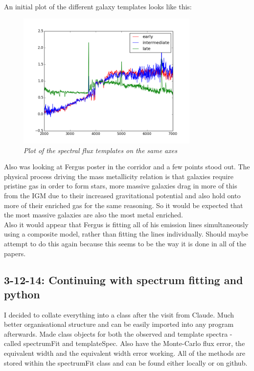 \documentclass{literature}
\begin{document}
An initial plot of the different galaxy templates looks like this: 

\begin{figure}[!htp]
\centering
\includegraphics[width=0.8\textwidth]{spectral_templates.png}
\caption{\footnotesize{\emph{Plot of the spectral flux templates on the same axes}}}
\label{templates}
\end{figure}

Also was looking at Fergus poster in the corridor and a few points stood out. The physical process driving the mass metallicity relation is that galaxies require pristine gas in order to form stars, more massive galaxies drag in more of this from the IGM due to their increased gravitational potential and also hold onto more of their enriched gas for the same reasoning. So it would be expected that the most massive galaxies are also the most metal enriched. \\ 
Also it would appear that Fergus is fitting all of his emission lines simultaneously using a composite model, rather than fitting the lines individually. Should maybe attempt to do this again because this seems to be the way it is done in all of the papers. \\

\subsection{3-12-14: Continuing with spectrum fitting and python}
I decided to collate everything into a class after the visit from Claude. Much better organisational structure and can be easily imported into any program afterwards. Made class objects for both the observed and template spectra - called spectrumFit and templateSpec. Also have the Monte-Carlo flux error, the equivalent width and the equivalent width error working. All of the methods are stored within the spectrumFit class and can be found either locally or on github.  
\end{document}
